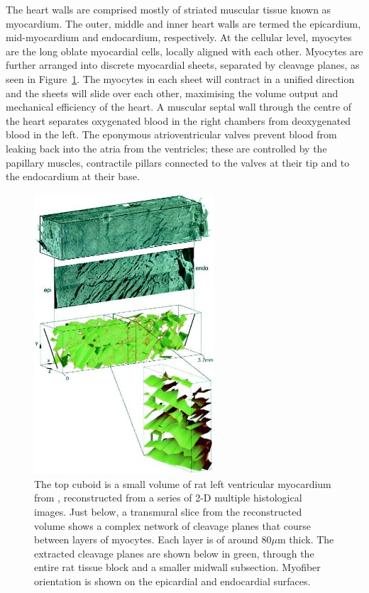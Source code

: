 The heart walls are comprised mostly of striated muscular tissue known as myocardium. The outer, middle and inner heart walls are termed the epicardium, mid-myocardium and endocardium, respectively. At the cellular level, myocytes are the long oblate myocardial cells, locally aligned with each other. Myocytes are further arranged into discrete myocardial sheets, separated by cleavage planes, as seen in Figure~\ref{fig:sheets}. The myocytes in each sheet will contract in a unified direction and the sheets will slide over each other, maximising the volume output and mechanical efficiency of the heart. A muscular septal wall through the centre of the heart separates oxygenated blood in the right chambers from deoxygenated blood in the left. The eponymous atrioventricular valves prevent blood from leaking back into the atria from the ventricles; these are controlled by the papillary muscles, contractile pillars connected to the valves at their tip and to the endocardium at their base.

  \begin{figure}[htbp]
    \centering
    \includegraphics[width=0.6\textwidth]{Ch2/Figs/sheets}
    \caption{The top cuboid is a small volume of rat left ventricular myocardium from \cite{Hooks2002}, reconstructed from a series of 2-D multiple histological images. Just below, a transmural slice from the reconstructed volume shows a complex network of cleavage planes that course between layers of myocytes. Each layer is of around 80$\mu$m thick. The extracted cleavage planes are shown below in green, through the entire rat tissue block and a smaller midwall subsection. Myofiber orientation is shown on the epicardial and endocardial surfaces.}
    \label{fig:sheets}
  \end{figure}

